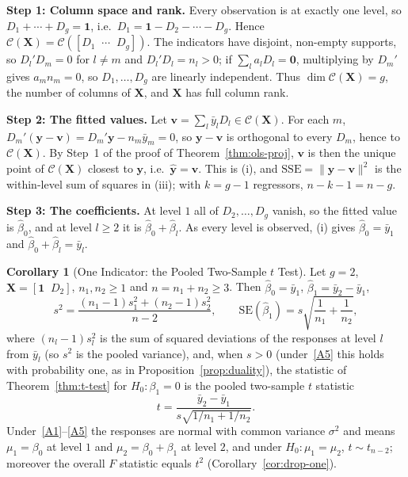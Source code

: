 \documentclass[12pt,a4paper]{article}
\makeatletter
\theoremstyle{definition}
\newtheorem{corollary}[theorem]{Corollary}
\renewenvironment{proof}[1][\proofname]{\par
  \pushQED{\qed}%
  \normalfont \topsep6\p@\@plus6\p@\relax
  \trivlist
  \item[\hskip\labelsep\bfseries #1\@addpunct{.}]\ignorespaces
}{%
  \popQED\endtrivlist\@endpefalse
}
\newcommand{\SSE}{\mathrm{SSE}}
\newcommand{\SE}{\mathrm{SE}}
\newcommand{\bX}{\mathbf{X}}
\newcommand{\by}{\mathbf{y}}
\newcommand{\bone}{\mathbf{1}}
\newcommand{\bzero}{\mathbf{0}}
\newcommand{\bv}{\mathbf{v}}
\newcommand{\calC}{\mathcal{C}}
\makeatother
\begin{document}
\begin{proof}
\textbf{Step 1: Column space and rank.} Every observation is at exactly one level, so $D_1 + \cdots + D_g = \bone$, i.e.\ $D_1 = \bone - D_2 - \cdots - D_g$. Hence $\calC(\bX) = \calC([D_1 \;\; \cdots \;\; D_g])$. The indicators have disjoint, non-empty supports, so $D_l'D_m = 0$ for $l \neq m$ and $D_l'D_l = n_l > 0$; if $\sum_l a_lD_l = \bzero$, multiplying by $D_m'$ gives $a_mn_m = 0$, so $D_1, \ldots, D_g$ are linearly independent. Thus $\dim\calC(\bX) = g$, the number of columns of $\bX$, and $\bX$ has full column rank.

\textbf{Step 2: The fitted values.} Let $\bv = \sum_l\bar y_lD_l \in \calC(\bX)$. For each $m$, $D_m'(\by - \bv) = D_m'\by - n_m\bar y_m = 0$, so $\by - \bv$ is orthogonal to every $D_m$, hence to $\calC(\bX)$. By Step~1 of the proof of Theorem~\ref{thm:ols-proj}, $\bv$ is then the unique point of $\calC(\bX)$ closest to $\by$, i.e.\ $\hat{\by} = \bv$. This is (i), and $\SSE = \|\by - \bv\|^2$ is the within-level sum of squares in (iii); with $k = g - 1$ regressors, $n - k - 1 = n - g$.

\textbf{Step 3: The coefficients.} At level $1$ all of $D_2, \ldots, D_g$ vanish, so the fitted value is $\hat\beta_0$, and at level $l \geqslant 2$ it is $\hat\beta_0 + \hat\beta_l$. As every level is observed, (i) gives $\hat\beta_0 = \bar y_1$ and $\hat\beta_0 + \hat\beta_l = \bar y_l$.
\end{proof}

\begin{corollary}[One Indicator: the Pooled Two-Sample $t$ Test]\label{cor:two-sample}
Let $g = 2$, $\bX = [\bone \;\; D_2]$, $n_1, n_2 \geqslant 1$ and $n = n_1 + n_2 \geqslant 3$. Then $\hat\beta_0 = \bar y_1$, $\hat\beta_1 = \bar y_2 - \bar y_1$,
\[
s^2 = \frac{(n_1 - 1)s_1^2 + (n_2 - 1)s_2^2}{n - 2}, \qquad \SE(\hat\beta_1) = s\sqrt{\frac{1}{n_1} + \frac{1}{n_2}},
\]
where $(n_l - 1)s_l^2$ is the sum of squared deviations of the responses at level $l$ from $\bar y_l$ (so $s^2$ is the pooled variance), and, when $s > 0$ (under~\ref{A5} this holds with probability one, as in Proposition~\ref{prop:duality}), the statistic of Theorem~\ref{thm:t-test} for $H_0\colon \beta_1 = 0$ is the pooled two-sample $t$ statistic
\[
t = \frac{\bar y_2 - \bar y_1}{s\sqrt{1/n_1 + 1/n_2}}.
\]
Under~\ref{A1}--\ref{A5} the responses are normal with common variance $\sigma^2$ and means $\mu_1 = \beta_0$ at level $1$ and $\mu_2 = \beta_0 + \beta_1$ at level $2$, and under $H_0\colon \mu_1 = \mu_2$, $t \sim t_{n-2}$; moreover the overall $F$ statistic equals $t^2$ (Corollary~\ref{cor:drop-one}).
\end{corollary}
\end{document}
